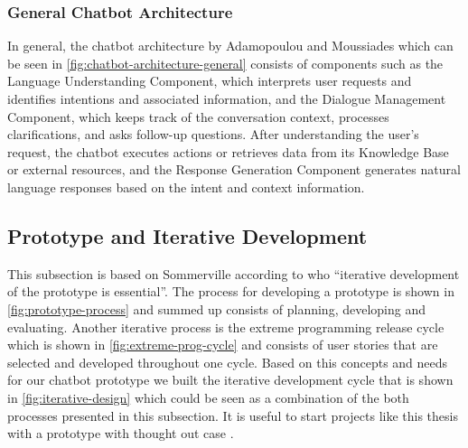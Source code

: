 \subsubsection{General Chatbot Architecture}
In general, the chatbot architecture by Adamopoulou and Moussiades \cite{adamopoulou_overview_2020} which can be seen in \cref{fig:chatbot-architecture-general} consists of components such as the Language Understanding Component, which interprets user requests and identifies intentions and associated information, and the Dialogue Management Component, which keeps track of the conversation context, processes clarifications, and asks follow-up questions. After understanding the user's request, the chatbot executes actions or retrieves data from its Knowledge Base or external resources, and the Response Generation Component generates natural language responses based on the intent and context information.

\subsection{Prototype and Iterative Development}

This subsection is based on Sommerville \cite{sommerville_software_2011} according to who ``iterative development of the prototype is essential''.
The process for developing a prototype is shown in \cref{fig:prototype-process} and summed up consists of planning, developing and evaluating.
Another iterative process is the extreme programming release cycle which is shown in \cref{fig:extreme-prog-cycle} and consists of user stories that are selected and developed throughout one cycle.
Based on this concepts and needs for our chatbot prototype we built the iterative development cycle that is shown in \cref{fig:iterative-design} which could be seen as a combination of the both processes presented in this subsection.
It is useful to start projects like this thesis with a prototype with thought out case \cite{lehmann_chatbot-guide_2021}.

